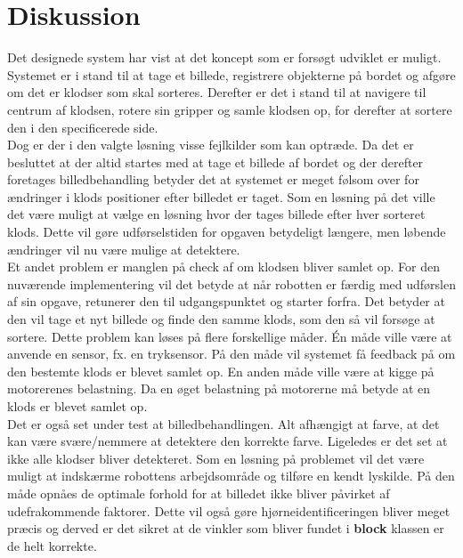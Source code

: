 \clearpage
\section{Diskussion}
Det designede system har vist at det koncept som er forsøgt udviklet er muligt. Systemet er i stand til at tage et billede, registrere objekterne på bordet og afgøre om det er klodser som skal sorteres. Derefter er det i stand til at navigere til centrum af klodsen, rotere sin gripper og samle klodsen op, for derefter at sortere den i den specificerede side.\\

Dog er der i den valgte løsning visse fejlkilder som kan optræde. Da det er besluttet at der altid startes med at tage et billede af bordet og der derefter foretages billedbehandling betyder det at systemet er meget følsom over for ændringer i klods positioner efter billedet er taget. Som en løsning på det ville det være muligt at vælge en løsning hvor der tages billede efter hver sorteret klods. Dette vil gøre udførselstiden for opgaven betydeligt længere, men løbende ændringer vil nu være mulige at detektere.\\ 

Et andet problem er manglen på check af om klodsen bliver samlet op. For den nuværende implementering vil det betyde at når robotten er færdig med udførslen af sin opgave, retunerer den til udgangspunktet og starter forfra. Det betyder at den vil tage et nyt billede og finde den samme klods, som den så vil forsøge at sortere. Dette problem kan løses på flere forskellige måder. Én måde ville være at anvende en sensor, fx. en tryksensor. På den måde vil systemet få feedback på om den bestemte klods er blevet samlet op. En anden måde ville være at kigge på motorerenes belastning. Da en øget belastning på motorerne må betyde at en klods er blevet samlet op.\\

Det er også set under test at billedbehandlingen. Alt afhængigt at farve, at det kan være svære/nemmere at detektere den korrekte farve. Ligeledes er det set at ikke alle klodser bliver detekteret.  Som en løsning på problemet vil det være muligt at indskærme robottens arbejdsområde og tilføre en kendt lyskilde. På den måde opnåes de optimale forhold for at billedet ikke bliver påvirket af udefrakommende faktorer. Dette vil også gøre hjørneidentificeringen bliver meget præcis og derved er det sikret at de vinkler som bliver fundet i \textbf{block} klassen er de helt korrekte.\\

